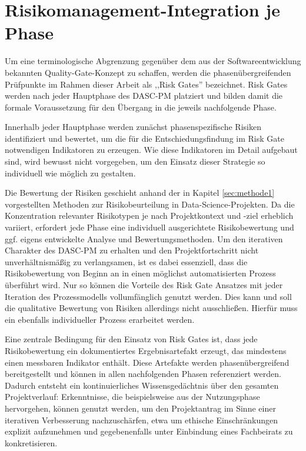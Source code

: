 \section{Risikomanagement-Integration je Phase}

Um eine terminologische Abgrenzung gegenüber dem aus der Softwareentwicklung 
bekannten Quality-Gate-Konzept zu schaffen, werden die phasenübergreifenden 
Prüfpunkte im Rahmen dieser Arbeit als ,,Risk Gates'' bezeichnet. 
Risk Gates werden nach jeder Hauptphase des DASC-PM platziert und bilden 
damit die formale Voraussetzung für den Übergang in die jeweils nachfolgende Phase.

Innerhalb jeder Hauptphase werden zunächst phasenspezifische Risiken 
identifiziert und bewertet, um die für die Entschiedungsfindung im Risk Gate
notwendigen Indikatoren zu erzeugen. Wie diese Indikatoren im Detail
aufgebaut sind, wird bewusst nicht vorgegeben, um den Einsatz dieser 
Strategie so individuell wie möglich zu gestalten.

Die Bewertung der Risiken geschieht anhand der in Kapitel \hyperref[sec:methode1]{\ref{sec:methode1}} vorgestellten Methoden
zur Risikobeurteilung in Data-Science-Projekten. Da die Konzentration relevanter
Risikotypen je nach Projektkontext und -ziel erheblich variiert, erfordert 
jede Phase eine individuell ausgerichtete Risikobewertung und ggf. eigens entwickelte 
Analyse und Bewertungsmethoden. Um den iterativen 
Charakter des DASC-PM zu erhalten und den Projektfortschritt nicht 
unverhältnismäßig zu verlangsamen, ist es dabei essenziell, dass die 
Risikobewertung von Beginn an in einen möglichst automatisierten Prozess 
überführt wird. Nur so können die Vorteile des Risk Gate Ansatzes mit jeder 
Iteration des Prozessmodells vollumfänglich genutzt werden. Dies kann und soll
die qualitative Bewertung von Risiken allerdings nicht ausschließen. Hierfür 
muss ein ebenfalls individueller Prozess erarbeitet werden.

Eine zentrale Bedingung für den Einsatz von Risk Gates ist, dass jede 
Risikobewertung ein dokumentiertes Ergebnisartefakt erzeugt, das mindestens 
einen messbaren Indikator enthält. Diese Artefakte werden phasenübergreifend 
bereitgestellt und können in allen nachfolgenden Phasen referenziert werden. 
Dadurch entsteht ein kontinuierliches Wissensgedächtnis über den gesamten 
Projektverlauf: Erkenntnisse, die beispielsweise aus der Nutzungsphase 
hervorgehen, können genutzt werden, um den Projektantrag im Sinne einer 
iterativen Verbesserung nachzuschärfen, etwa um ethische Einschränkungen 
explizit aufzunehmen und gegebenenfalls unter Einbindung eines Fachbeirats 
zu konkretisieren.

